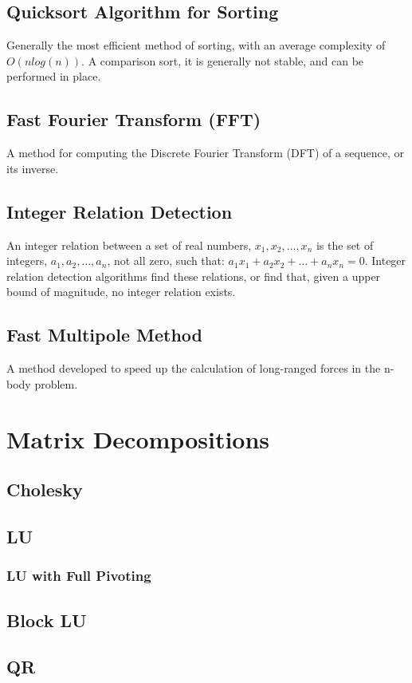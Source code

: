 \documentclass[10pt,letterpaper]{scrartcl}
\begin{document}
\subsection{Quicksort Algorithm for Sorting}
Generally the most efficient method of sorting, with an average complexity of $O(nlog(n))$. A comparison sort, it is generally not stable, and can be performed in place. 

\subsection{Fast Fourier Transform (FFT)}
A method for computing the Discrete Fourier Transform (DFT) of a sequence, or its inverse. 

\subsection{Integer Relation Detection}
An integer relation between a set of real numbers, $x_1, x_2, \ldots , x_n$ is the set of integers, $a_1, a_2, \ldots , a_n$, not all zero, such that: $a_1x_1 + a_2x_2 + \ldots + a_nx_n = 0$. Integer relation detection algorithms find these relations, or find that, given a upper bound of magnitude, no integer relation exists.

\subsection{Fast Multipole Method}
A method developed to speed up the calculation of long-ranged forces in the n-body problem. 

\newpage\section{Matrix Decompositions}
\subsection{Cholesky}
\subsection{LU}
\subsubsection{LU with Full Pivoting}
\subsection{Block LU}
\subsection{QR}
\end{document}
